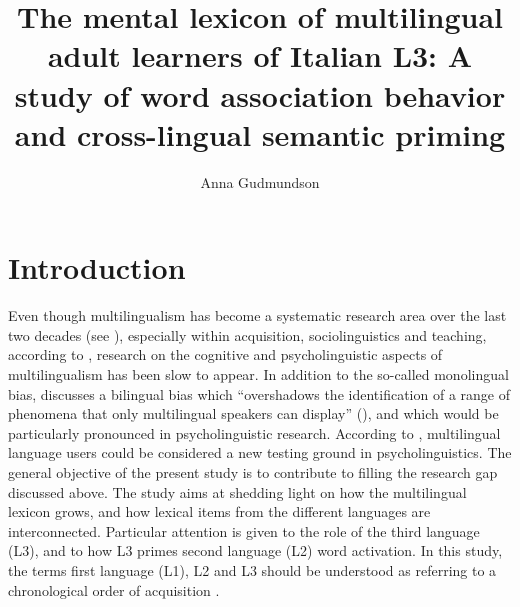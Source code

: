 \documentclass[output=paper,colorlinks,citecolor=brown,nonflat]{langsci/langscibook}
\author{Anna Gudmundson	\affiliation{Stockholm University}}
\title{The mental lexicon of multilingual adult learners of Italian L3: A study of word association behavior and cross-lingual semantic priming}
\begin{document}
\maketitle
{}



\section{Introduction}\label{sec:gudmundson:1}

Even though multilingualism has become a systematic research area over the last two decades (see \citealt{CenozEtAl2001, DeAngelis2007, GarciaMayo2012, Szubko-Sitarek2015}), especially within acquisition, sociolinguistics and teaching, according to \citet[1]{DeAngelis2007}, research on the cognitive and psycholinguistic aspects of multilingualism has been slow to appear. In addition to the so-called monolingual bias, \citeauthor{DeAngelis2007} discusses a bilingual bias which “overshadows the identification of a range of phenomena that only multilingual speakers can display” (\citeyear[13]{DeAngelis2007}), and which would be particularly pronounced in psycholinguistic research. According to \citet[10]{Szubko-Sitarek2015}, multilingual language users could be considered a new testing ground in psycholinguistics. The general objective of the present study is to contribute to filling the research gap discussed above. The study aims at shedding light on how the multilingual lexicon grows, and how lexical items from the different languages are interconnected. Particular attention is given to the role of the third language (L3), and to how L3 primes second language (L2) word activation. In this study, the terms first language (L1), L2 and L3 should be understood as referring to a chronological order of acquisition \citep{Hammarberg2014}.
\end{document}
